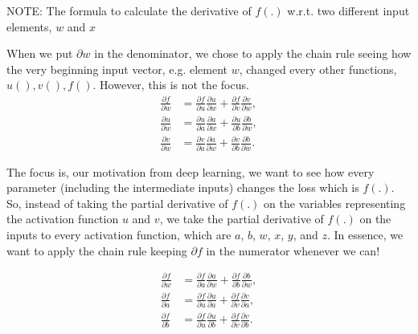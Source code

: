 NOTE: The formula to calculate the derivative of $f(.)$ w.r.t. two different input elements, $w$ and $x$

When we put $\partial{w}$  in the denominator, we chose to apply the chain rule
seeing how the very beginning input vector, e.g. element $w$, changed every
other functions, $u(), v(), f()$. However, this is not the focus.
\begin{equation}
\begin{aligned}
\frac{\partial f}{\partial w} & = \frac{\partial f}{\partial u}\frac{\partial u}{\partial w} + \frac{\partial f}{\partial v}\frac{\partial v}{\partial w}, \\
\frac{\partial u}{\partial w} & = \frac{\partial u}{\partial a}\frac{\partial a}{\partial w}+\frac{\partial u}{\partial b}\frac{\partial b}{\partial w}, \\
\frac{\partial v}{\partial w} & = \frac{\partial v}{\partial a}\frac{\partial a}{\partial w}+\frac{\partial v}{\partial b}\frac{\partial b}{\partial w}.
\end{aligned}
\end{equation}

The focus is,  our motivation from deep learning, we want to see how every
parameter (including the intermediate inputs) changes the loss which is $f(.)$.
So, instead of taking the partial derivative of $f(.)$ on the variables
representing the activation function $u$ and $v$, we take the partial derivative
of $f(.)$ on the inputs to every activation function, which are $a$, $b$, $w$,
$x$, $y$, and $z$.
In essence, we want to apply the chain rule keeping $\partial{f}$ in the
numerator whenever we can!

\begin{equation}
\begin{aligned}
\frac{\partial f}{\partial w} & = \frac{\partial f}{\partial a}\frac{\partial a}{\partial w} + \frac{\partial f}{\partial b}\frac{\partial b}{\partial w}, \\
\frac{\partial f}{\partial a} & = \frac{\partial f}{\partial u}\frac{\partial u}{\partial a}+\frac{\partial f}{\partial v}\frac{\partial v}{\partial a}, \\
\frac{\partial f}{\partial b} & = \frac{\partial f}{\partial u}\frac{\partial u}{\partial b}+\frac{\partial f}{\partial v}\frac{\partial v}{\partial b}.
\end{aligned}
\end{equation}

